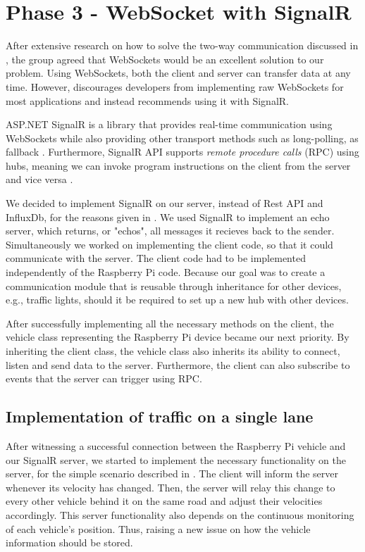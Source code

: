\section{Phase 3 - WebSocket with SignalR}\label{phase3}
After extensive research on how to solve the two-way communication discussed in , the group agreed that WebSockets would be an excellent solution to our problem. Using WebSockets, both the client and server can transfer data at any time. However, \cite{microsoft_websockets} discourages developers from implementing raw WebSockets for most applications and instead recommends using it with SignalR.

ASP.NET SignalR is a library that provides real-time communication using WebSockets while also providing other transport methods such as long-polling, as fallback \parencite{microsoft_signalr}. Furthermore, SignalR API supports \emph{remote procedure calls} (RPC) using hubs, meaning we can invoke program instructions on the client from the server and vice versa \parencite{microsoft_signalr}.

We decided to implement SignalR on our server, instead of Rest API and InfluxDb, for the reasons given in . We used SignalR to implement an echo server, which returns, or "echos", all messages it recieves back to the sender. Simultaneously we worked on implementing the client code, so that it could communicate with the server. The client code had to be implemented independently of the Raspberry Pi code. Because our goal was to create a communication module that is reusable through inheritance for other devices, e.g., traffic lights, should it be required to set up a new hub with other devices.

After successfully implementing all the necessary methods on the client, the vehicle class representing the Raspberry Pi device became our next priority. By inheriting the client class, the vehicle class also inherits its ability to connect, listen and send data to the server. Furthermore, the client can also subscribe to events that the server can trigger using RPC.

\subsection{Implementation of traffic on a single lane}
After witnessing a successful connection between the Raspberry Pi vehicle and our SignalR server, we started to implement the necessary functionality on the server, for the simple scenario described in . The client will inform the server whenever its velocity has changed. Then, the server will relay this change to every other vehicle behind it on the same road and adjust their velocities accordingly. This server functionality also depends on the continuous monitoring of each vehicle's position. Thus, raising a new issue on how the vehicle information should be stored.

